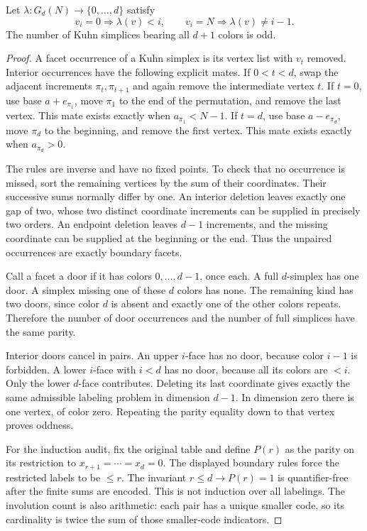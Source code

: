 \begin{lemma}\label{lem:cubical-parity}
Let $\lambda:G_d(N)\to\{0,\ldots,d\}$ satisfy
\[
 v_i=0\Longrightarrow \lambda(v)<i,\qquad
 v_i=N\Longrightarrow \lambda(v)\ne i-1.
\]
The number of Kuhn simplices bearing all $d+1$ colors is odd.
\end{lemma}
\begin{proof}
A facet occurrence of a Kuhn simplex is its vertex list with $v_t$ removed. Interior occurrences have the following explicit mates.
If $0<t<d$, swap the adjacent increments $\pi_t,\pi_{t+1}$ and again remove the intermediate vertex $t$.
If $t=0$, use base $a+e_{\pi_1}$, move $\pi_1$ to the end of the permutation, and remove the last vertex. This mate exists exactly when $a_{\pi_1}<N-1$.
If $t=d$, use base $a-e_{\pi_d}$, move $\pi_d$ to the beginning, and remove the first vertex. This mate exists exactly when $a_{\pi_d}>0$.

The rules are inverse and have no fixed points. To check that no occurrence is missed, sort the remaining vertices by the sum of their coordinates. Their successive sums normally differ by one. An interior deletion leaves exactly one gap of two, whose two distinct coordinate increments can be supplied in precisely two orders. An endpoint deletion leaves $d-1$ increments, and the missing coordinate can be supplied at the beginning or the end. Thus the unpaired occurrences are exactly boundary facets.

Call a facet a door if it has colors $0,\ldots,d-1$, once each. A full $d$-simplex has one door. A simplex missing one of these $d$ colors has none. The remaining kind has two doors, since color $d$ is absent and exactly one of the other colors repeats. Therefore the number of door occurrences and the number of full simplices have the same parity.

Interior doors cancel in pairs. An upper $i$-face has no door, because color $i-1$ is forbidden. A lower $i$-face with $i<d$ has no door, because all its colors are $<i$. Only the lower $d$-face contributes. Deleting its last coordinate gives exactly the same admissible labeling problem in dimension $d-1$. In dimension zero there is one vertex, of color zero. Repeating the parity equality down to that vertex proves oddness.

For the induction audit, fix the original table and define $P(r)$ as the parity on its restriction to $x_{r+1}=\cdots=x_d=0$. The displayed boundary rules force the restricted labels to be $\leq r$. The invariant $r\leq d\to P(r)=1$ is quantifier-free after the finite sums are encoded. This is not induction over all labelings. The involution count is also arithmetic: each pair has a unique smaller code, so its cardinality is twice the sum of those smaller-code indicators.
\end{proof}

